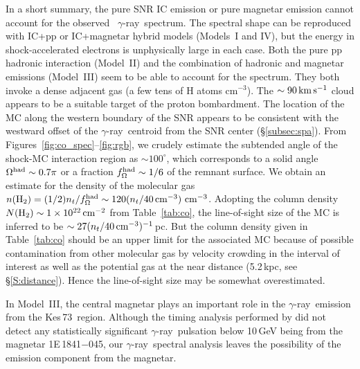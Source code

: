 \documentclass[12pt,preprint]{aastex}
\newcommand{\E}[1]{\times 10^{#1}}
\newcommand{\cm}{\,{\rm cm}}    \newcommand{\km}{\,{\rm km}}
\newcommand{\nHH}{n({\rm H}_{2})} \newcommand{\NHH}{N({\rm H}_{2})}
\newcommand{\snr}{{\rm Kes\,73}}  \newcommand{\MMSNR}{{\rm thermal composite SNR}}
\newcommand{\gray}{{\rm $\gamma$-ray}}
\begin{document}
In a short summary, the pure SNR IC emission or pure magnetar emission
cannot account for the observed \Fermi\ \gray\ spectrum.
The spectral shape can be reproduced  with  IC+pp or IC+magnetar
hybrid models (Models~I and IV), but the energy  in shock-accelerated
electrons is unphysically large in each case.
Both the pure pp hadronic interaction (Model~II) and
the combination of hadronic and magnetar emissions (Model~III)
seem to be able to account for the spectrum.
They both invoke a dense  adjacent gas
(a few tens of  H atoms cm$^{-3}$).
The $\sim90\km\ps$ cloud appears to be a suitable target of the proton bombardment.
The location of the MC along the western boundary of the SNR
appears to be consistent with the westward offset of the \gray\ centroid
from the SNR center (\S\ref{subsec:spa}).
From Figures~\ref{fig:co_spec}--\ref{fig:rgb},
we crudely estimate the subtended angle of the shock-MC interaction region
as $\sim100^{\circ}$, which corresponds to a solid angle $\Omega^{\rm had}\sim0.7\pi$
or a fraction $f_{\Omega}^{\rm had}\sim1/6$ of the remnant surface.
We obtain an estimate for the density of the molecular gas
$\nHH=(1/2)n_t/f_{\Omega}^{\rm had}\sim120(n_t/40\cm^{-3})\,\cm^{-3}$.
Adopting the column density $\NHH\sim1\E{22}\cm^{-2}$ from Table~\ref{tab:co},
the line-of-sight size of the MC is inferred to be $\sim27(n_t/40\cm^{-3})^{-1}$\,pc.
But the column density given in Table~\ref{tab:co} should be an upper limit
for the associated MC because of possible
contamination from other molecular gas by velocity crowding
in the interval of interest as well as the potential gas at the near distance
(5.2\,kpc, see \S\ref{S:distance}).
Hence the line-of-sight size may be somewhat overestimated.

In Model~III, the central magnetar plays an important role
in the \gray\ emission from the \snr\ region.
Although the timing analysis performed by  \citet{Lijian2017magnetar}
did not detect any statistically significant \gray\ pulsation below 10\,GeV
 being from the magnetar 1E\,1841$-$045,
our \gray\ spectral analysis leaves the possibility of the emission
component from the magnetar.
\end{document}

